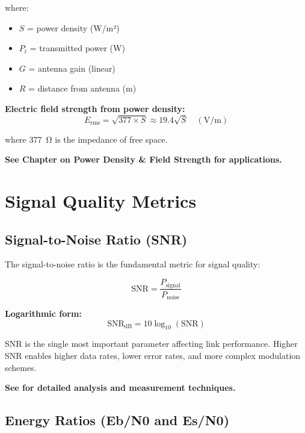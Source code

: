where:
\begin{itemize}
\item $S$ = power density (W/m²)
\item $P_t$ = transmitted power (W)
\item $G$ = antenna gain (linear)
\item $R$ = distance from antenna (m)
\end{itemize}

\textbf{Electric field strength from power density:}
\begin{equation}
\label{eq:field-strength}
E_{\text{rms}} = \sqrt{377 \times S} \approx 19.4\sqrt{S} \quad (\text{V/m})
\end{equation}

where 377~Ω is the impedance of free space.

\textbf{See Chapter on Power Density \& Field Strength for applications.}

\section{Signal Quality Metrics}
\label{sec:signal-quality}

\subsection{Signal-to-Noise Ratio (SNR)}
\label{subsec:snr}

The signal-to-noise ratio is the fundamental metric for signal quality:

\begin{equation}
\label{eq:snr-linear}
\text{SNR} = \frac{P_{\text{signal}}}{P_{\text{noise}}}
\end{equation}

\textbf{Logarithmic form:}
\begin{equation}
\label{eq:snr-db}
\text{SNR}_{\text{dB}} = 10\log_{10}(\text{SNR})
\end{equation}

\begin{keyconcept}
SNR is the single most important parameter affecting link performance. Higher SNR enables higher data rates, lower error rates, and more complex modulation schemes.
\end{keyconcept}

\textbf{See  for detailed analysis and measurement techniques.}

\subsection{Energy Ratios (Eb/N0 and Es/N0)}
\label{subsec:energy-ratios}


